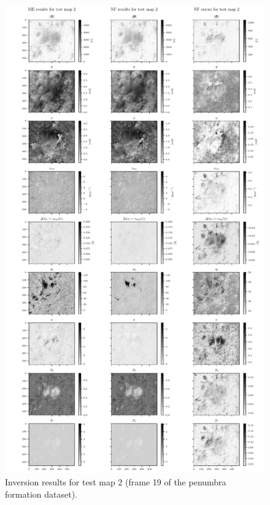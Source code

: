 \documentclass[a4paper,12pt]{report}
\begin{document}
\begin{figure}[h!]
\centering
\includegraphics[height=\textheight-1cm]{figures/nf-milne-eddington-example-2-nflows-piecewisequadratic-comp-ME-NF-testmap2.pdf}
\caption{Inversion results for test map 2 (frame 19 of the penumbra formation dataset).}
\label{fig:nf-milne-eddington-example-2-nflows-piecewisequadratic-comp-ME-NF-testmap2}
\end{figure}
\end{document}
